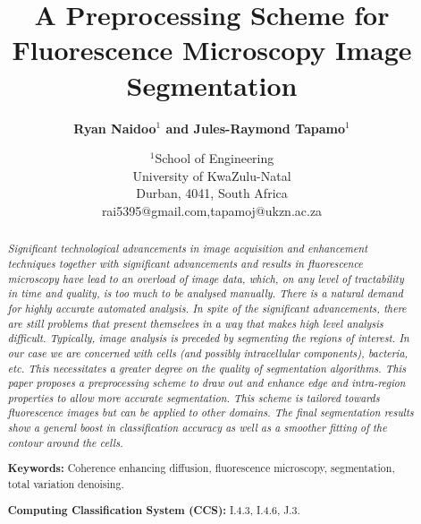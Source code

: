 \documentclass[a4paper,11pt]{ijamas}
\begin{document}

\title{A Preprocessing Scheme for Fluorescence Microscopy Image Segmentation}

\author{\textbf{Ryan Naidoo$^1$ and Jules-Raymond Tapamo$^1$}}

\date{$^1$School of Engineering\\
University of KwaZulu-Natal\\
Durban, 4041, South Africa\\
rai5395@gmail.com,tapamoj@ukzn.ac.za}

\maketitle





\begin{abstract}

\noindent \emph{Significant technological advancements in image acquisition and enhancement techniques together with significant advancements and results in fluorescence microscopy have lead to an overload of image data, which, on any level of tractability in time and quality, is too much to be analysed manually. There is a natural demand for highly accurate automated analysis. In spite of the significant advancements, there are still problems that present themselves in a way that makes high level analysis difficult. Typically, image analysis is preceded by segmenting the regions of interest. In our case we are concerned with cells (and possibly intracellular components), bacteria, etc. This necessitates a greater degree on the quality of segmentation algorithms. This paper proposes a preprocessing scheme to draw out and enhance edge and intra-region properties to allow more accurate segmentation. This scheme is tailored towards fluorescence images but can be applied to other domains. The final segmentation results show a general boost in classification accuracy as well as a smoother fitting of the contour around the cells.}
\medskip

\noindent\textbf{Keywords:} Coherence enhancing diffusion, fluorescence microscopy, segmentation, total variation denoising.

\medskip

\noindent\textbf{Computing Classification System (CCS):} I.4.3, I.4.6, J.3.

\end{abstract}
\end{document}
